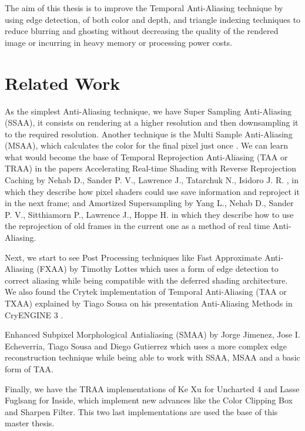 \documentclass{cslthse-msc}
\begin{document}
The aim of this thesis is to improve the Temporal Anti-Aliasing technique by using edge detection, of both color and depth, and triangle indexing techniques to reduce blurring and ghosting without decreasing the quality of the rendered image or incurring in heavy memory or processing power costs.  


\section{Related Work}
As the simplest Anti-Aliasing technique, we have Super Sampling Anti-Aliasing (SSAA), it consists on rendering at a higher resolution and then downsampling it to the required resolution. Another technique is the Multi Sample Anti-Aliasing (MSAA), which calculates the color for the final pixel just once \cite{Doggett2017EDAN35}.  We can learn what would become the base of Temporal Reprojection Anti-Aliasing (TAA or TRAA) in the papers Accelerating Real-time Shading with Reverse Reprojection Caching  by Nehab D., Sander P. V., Lawrence J., Tatarchuk N., Isidoro J. R. \cite{Nehab2007}, in which they describe how pixel shaders could use save information and reproject it in the next frame; and Amortized Supersampling by Yang L., Nehab D., Sander P. V., Sitthiamorn P., Lawrence J., Hoppe H. \cite{Yang2009} in which they describe how to use the reprojection of old frames in the current one as a method of real time Anti-Aliasing.

Next, we start to see Post Processing techniques like Fast Approximate Anti-Aliasing (FXAA) by Timothy Lottes \cite{Lottes2009} which uses a form of edge detection to correct aliasing while being compatible with the deferred shading architecture. We also found the Crytek implementation of Temporal Anti-Aliasing (TAA or TXAA) explained by Tiago Sousa on his presentation Anti-Aliasing Methods in CryENGINE 3 \cite{JIMENEZ2011_SIGGRAPH11}.

Enhanced Subpixel Morphological Antialiasing (SMAA) by Jorge Jimenez, Jose I. Echeverria, Tiago Sousa and Diego Gutierrez \cite{Jimenez2012} which uses a more complex edge reconstruction technique while being able to work with SSAA, MSAA and a basic form of TAA.
 
Finally, we have the TRAA implementations of Ke Xu  for Uncharted 4 and Lasse Fuglsang for Inside, which implement new advances like the Color Clipping Box and Sharpen Filter. This two last implementations are used the base of this master thesis. \cite{Fuglsand2016, XU2016}
\end{document}
